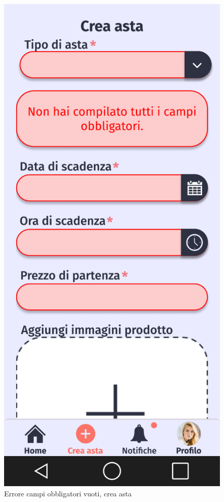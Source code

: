     \begin{figure}[!htb]
        \begin{minipage}{0.32\textwidth}
            \centering
            \includegraphics[width=.7\linewidth]{Immagini/Frames/Errori/E11.pdf}
            \caption{Errore campi obbligatori vuoti, crea asta}
        \end{minipage}\hfill
        \begin{minipage}{0.32\textwidth}
            \centering

\end{minipage}
\end{figure}
